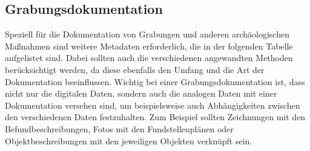 \subsection{Grabungsdokumentation}
Speziell für die Dokumentation von Grabungen und anderen archäologischen Maßnahmen sind weitere Metadaten erforderlich, die in der folgenden Tabelle aufgelistet sind. Dabei sollten auch die verschiedenen angewandten Methoden berücksichtigt werden, da diese ebenfalls den Umfang und die Art der Dokumentation beeinflussen. Wichtig bei einer Grabungsdokumentation ist, dass nicht nur die digitalen Daten, sondern auch die analogen Daten mit einer Dokumentation versehen sind, um beispielsweise auch Abhängigkeiten zwischen den verschiedenen Daten festzuhalten. Zum Beispiel sollten Zeichnungen mit den Befundbeschreibungen, Fotos mit den Fundstellenplänen oder Objektbeschreibungen mit den jeweiligen Objekten verknüpft sein.

